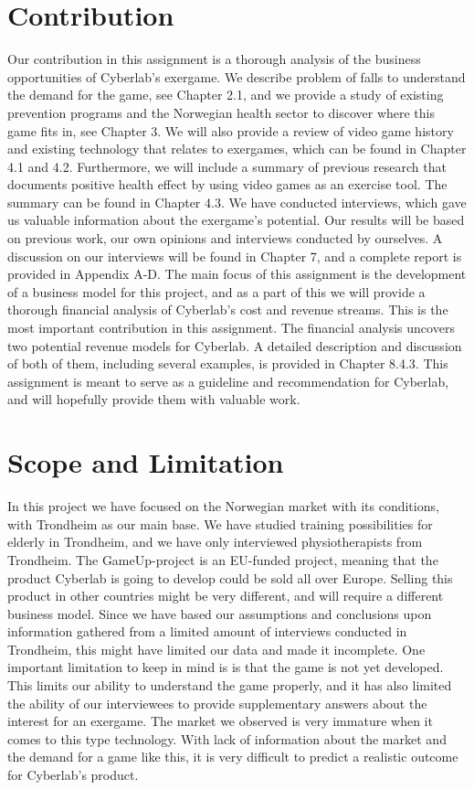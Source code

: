 \section{Contribution}
Our contribution in this assignment is a thorough analysis of the business opportunities of Cyberlab’s exergame. We describe problem of falls to understand the demand for the game, see Chapter 2.1, and we provide a study of existing prevention programs and the Norwegian health sector to discover where this game fits in, see Chapter 3. We will also provide a review of video game history and existing technology that relates to exergames, which can be found in Chapter 4.1 and 4.2. Furthermore, we will include a summary of previous research that documents positive health effect by using video games as an exercise tool. The summary can be found in Chapter 4.3. We have conducted interviews, which gave us valuable information about the exergame’s potential. Our results will be based on previous work, our own opinions and interviews conducted by ourselves. A discussion on our interviews will be found in Chapter 7, and a complete report is provided in Appendix A-D. The main focus of this assignment is the development of a business model for this project, and as a part of this we will provide a thorough financial analysis of Cyberlab’s cost and revenue streams. This is the most important contribution in this assignment. The financial analysis uncovers two potential revenue models for Cyberlab. A detailed description and discussion of both of them, including several examples, is provided in Chapter 8.4.3. This assignment is meant to serve as a guideline and recommendation for Cyberlab, and will hopefully provide them with valuable work.

\section{Scope and Limitation}
In this project we have focused on the Norwegian market with its conditions, with Trondheim as our main base. We have studied training possibilities for elderly in Trondheim, and we have only interviewed physiotherapists from Trondheim. The GameUp-project is an EU-funded project, meaning that the product Cyberlab is going to develop could be sold all over Europe.  Selling this product in other countries might be very different, and will require a different business model. Since we have based our assumptions and conclusions upon information gathered from a limited amount of interviews conducted in Trondheim, this might have limited our data and made it incomplete. One important limitation to keep in mind is is that the game is not yet developed. This limits our ability to understand the game properly, and it has also limited the ability of our interviewees to provide supplementary answers about the interest for an exergame.  The market we observed is very immature when it comes to this type technology. With lack of information about the market and the demand for a game like this, it is very difficult to predict a realistic outcome for Cyberlab’s product.

